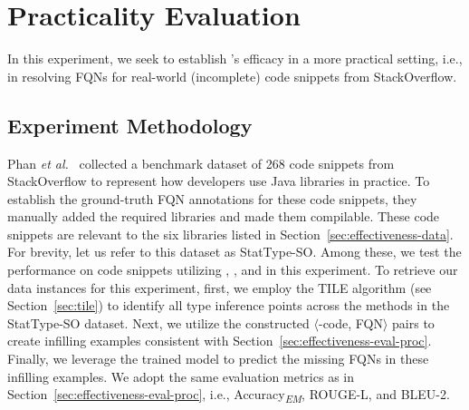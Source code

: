 \section{Practicality Evaluation}
\label{sec:eval}

In this experiment, we seek to establish \tool's efficacy in a more practical setting, i.e., in resolving FQNs for real-world (incomplete) code snippets from StackOverflow.

\subsection{Experiment Methodology}
Phan {\em et al.}~\cite{icse18} collected a benchmark dataset of 268 code snippets from StackOverflow to represent how developers use Java libraries in practice. To establish the ground-truth FQN annotations for these code snippets, they manually added the required libraries and made them compilable. These code snippets are relevant to the six libraries listed in Section~\ref{sec:effectiveness-data}. For brevity, let us refer to this dataset as StatType-SO. Among these, 
we test the performance on code snippets utilizing , , and  in this experiment.
To retrieve our data instances for this experiment, first, we employ the TILE algorithm (see Section~\ref{sec:tile}) to identify all type inference points across the methods in the StatType-SO dataset. Next, we utilize the constructed $\langle$\blank-code, FQN$\rangle$ pairs to create infilling examples consistent with Section~\ref{sec:effectiveness-eval-proc}. Finally, we leverage the trained \tool model to predict the missing FQNs in these infilling examples.
We adopt the same evaluation metrics as in Section~\ref{sec:effectiveness-eval-proc}, i.e., Accuracy\textsubscript{\textit{EM}}, ROUGE-L, and BLEU-2.

